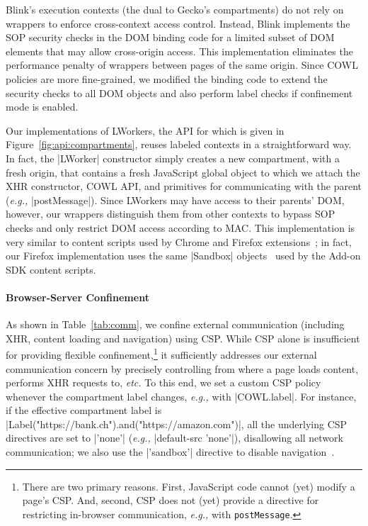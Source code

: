 Blink's execution contexts (the dual to Gecko's compartments) do not
rely on wrappers to enforce cross-context access control.
%
Instead, Blink implements the SOP security checks in the DOM binding
code for a limited subset of DOM elements that may allow cross-origin
access.
%
This implementation eliminates the performance penalty of wrappers between pages of
the same origin.
%
Since COWL policies are more fine-grained, we modified the binding
code to extend the security checks to all DOM objects and also
perform label checks if confinement mode is enabled.
%

Our implementations of LWorkers, the API for which is given in
Figure~\ref{fig:api:compartments}, reuses labeled
contexts in a straightforward way.
%
In fact, the \js|LWorker| constructor simply creates a new
compartment, with a fresh origin, that contains a fresh JavaScript
global object to which we attach the XHR constructor, COWL API, and
primitives for communicating with the parent (\emph{e.g.,}
\js|postMessage|).
%
Since LWorkers may have access to their parents' DOM, however, our
wrappers distinguish them from other contexts to bypass SOP checks and
only restrict DOM access according to MAC.
%
This implementation is very similar to content scripts used by Chrome
and Firefox extensions~\cite{Carlini:2012, addon-sdk}; in fact, our
Firefox implementation uses the same \js|Sandbox|
objects~\cite{mdn-sandbox} used by the Add-on SDK content scripts.
 
\paragraph{Browser-Server Confinement}%
%
As shown in Table~\ref{tab:comm}, we confine external communication
(including XHR, content loading and navigation) using CSP\@.
%
%
While CSP alone is insufficient for providing flexible
confinement,\footnote{
There are two primary reasons. First,
JavaScript code cannot (yet) modify a page's CSP\@.
And, second, CSP does not (yet) provide a directive for restricting 
in-browser communication, \emph{e.g.,} with \texttt{postMessage}.
}
it sufficiently addresses our external communication concern by
precisely controlling from where a page loads content, performs XHR
requests to, \emph{etc.}
%
To this end, we set a custom CSP policy whenever the compartment label
changes, \emph{e.g.,} with \js|COWL.label|.
%
For instance, if the effective compartment label is
\js|Label("https://bank.ch").and("https://amazon.com")|, all the
underlying CSP directives are set to \js|'none'| (\emph{e.g.,}
\js|default-src 'none'|), disallowing all network communication;
we also use the \js|'sandbox'| directive to disable
navigation~\cite{csp1.1,whatwg-html,html5}.
%

